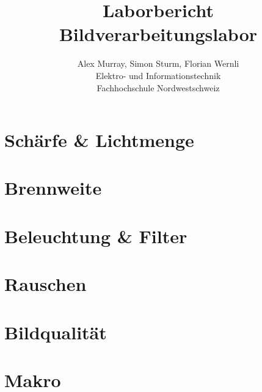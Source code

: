 \documentclass{templates/fhnwreport}
\begin{document}
\title{
  Laborbericht\\[.5em]
  Bildverarbeitungslabor  
}
\author{
  Alex Murray, Simon Sturm, Florian Wernli\\
  Elektro- und Informationstechnik\\
  Fachhochschule Nordwestschweiz\\
}


\maketitle

\clearpage
\pagestyle{empty}
{
  \tableofcontents
}

\clearpage
\pagestyle{fancy}
\section{Schärfe \& Lichtmenge}


\clearpage
\section{Brennweite}


\clearpage
\section{Beleuchtung \& Filter}


\clearpage
\section{Rauschen}


\clearpage
\section{Bildqualität}


\clearpage
\section{Makro}


\clearpage
{}


\end{document}
